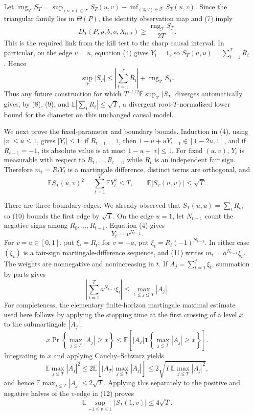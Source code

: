 Let
\(\operatorname{rng}_{\mathcal T}S_T=\sup_{(u,v)\in\mathcal T}S_T(u,v)-\inf_{(u,v)\in\mathcal T}S_T(u,v)\).  Since the triangular family lies in \(\Theta(P)\), the identity observation map and (7) imply
\[
 D_T(P,\rho,b,o,X_{0:T})
 \geq \frac{\operatorname{rng}_{\mathcal T}S_T}{2T}.
 \tag{8}
\]
This is the required link from the kill test to the sharp causal interval.  In particular, on the edge \(v=u\), equation (4) gives \(Y_t=1\), so \(S_T(u,u)=\sum_{t=1}^TR_t\).  Hence
\[
 \sup_{\mathcal T}|S_T|
 \leq\left|\sum_{t=1}^TR_t\right|+\operatorname{rng}_{\mathcal T}S_T.
 \tag{9}
\]
Thus any future construction for which \(T^{-1/2}\mathbb E\sup_{\mathcal T}|S_T|\) diverges automatically gives, by (8), (9), and \(\mathbb E|\sum_tR_t|\leq\sqrt T\), a divergent root-\(T\)-normalized lower bound for the diameter on this unchanged causal model.

We next prove the fixed-parameter and boundary bounds.  Induction in (4), using \(|v|\leq u\leq1\), gives \(|Y_t|\leq1\): if \(R_{t-1}=1\), then \(1-u+uY_{t-1}\in[1-2u,1]\), and if \(R_{t-1}=-1\), its absolute value is at most \(1-u+|v|\leq1\).  For fixed \((u,v)\), \(Y_t\) is measurable with respect to \(R_1,\ldots,R_{t-1}\), while \(R_t\) is an independent fair sign.  Therefore \(m_t=R_tY_t\) is a martingale difference, distinct terms are orthogonal, and
\[
 \mathbb E S_T(u,v)^2=\sum_{t=1}^T\mathbb EY_t^2\leq T,
 \qquad
 \mathbb E|S_T(u,v)|\leq\sqrt T.
 \tag{10}
\]

There are three boundary edges.  We already observed that \(S_T(u,u)=\sum_tR_t\), so (10) bounds the first edge by \(\sqrt T\).  On the edge \(u=1\), let \(N_{t-1}\) count the negative signs among \(R_0,\ldots,R_{t-1}\).  Equation (4) gives
\[
 Y_t=v^{N_{t-1}}.
 \tag{11}
\]
For \(v=a\in[0,1]\), put \(\xi_t=R_t\); for \(v=-a\), put \(\xi_t=R_t(-1)^{N_{t-1}}\).  In either case \((\xi_t)\) is a fair-sign martingale-difference sequence, and (11) writes \(m_t=a^{N_{t-1}}\xi_t\).  The weights are nonnegative and nonincreasing in \(t\).  If \(A_j=\sum_{t=1}^j\xi_t\), summation by parts gives
\[
 \left|\sum_{t=1}^T a^{N_{t-1}}\xi_t\right|
 \leq\max_{1\leq j\leq T}|A_j|.
 \tag{12}
\]
For completeness, the elementary finite-horizon martingale maximal estimate used here follows by applying the stopping time at the first crossing of a level \(x\) to the submartingale \(|A_j|\):
\[
 x\Pr\left\{\max_{j\leq T}|A_j|\geq x\right\}
 \leq \mathbb E\left[|A_T|\mathbf 1\left\{\max_{j\leq T}|A_j|\geq x\right\}\right].
\]
Integrating in \(x\) and applying Cauchy--Schwarz yields
\[
 \mathbb E\max_{j\leq T}|A_j|^2
 \leq2\mathbb E\left[|A_T|\max_{j\leq T}|A_j|\right]
 \leq2\sqrt{T\,\mathbb E\max_{j\leq T}|A_j|^2},
\]
and hence \(\mathbb E\max_{j\leq T}|A_j|\leq2\sqrt T\).  Applying this separately to the positive and negative halves of the \(v\)-edge in (12) proves
\[
 \mathbb E\sup_{-1\leq v\leq1}|S_T(1,v)|\leq4\sqrt T.
 \tag{13}
\]

